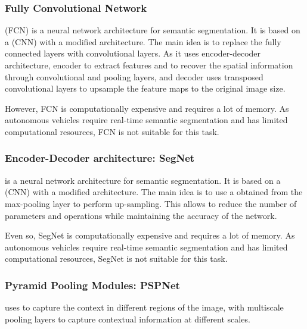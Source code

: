     \subsubsection{Fully Convolutional Network\cite{long2015fully}}

       (FCN) is a neural network architecture
      for semantic segmentation. It is based on a 
      (CNN) with a modified architecture. The main idea is to replace the fully
      connected layers with convolutional layers. As it uses encoder-decoder architecture,
      encoder to extract features and to recover the spatial information through
      convolutional and pooling layers, and decoder uses transposed convolutional
      layers to upsample the feature maps to the original image size\cite{long2015fully}.

      However, FCN is computationally expensive and requires a lot of memory. As
      autonomous vehicles require real-time semantic segmentation and has limited
      computational resources, FCN is not suitable for this task.

    \subsubsection{Encoder-Decoder architecture: SegNet\cite{badrinarayanan2017segnet}}

       is a neural network architecture for semantic segmentation. It
      is based on a  (CNN) with a modified architecture.
      The main idea is to use a  obtained from the max-pooling
      layer to perform up-sampling. This allows to reduce the number of parameters
      and operations while maintaining the accuracy of the network\cite{badrinarayanan2017segnet}.

      Even so, SegNet is computationally expensive and requires a lot of memory. As
      autonomous vehicles require real-time semantic segmentation and has limited
      computational resources, SegNet is not suitable for this task.

    \subsubsection{Pyramid Pooling Modules: PSPNet}

       uses  to capture the context in different
      regions of the image, with multiscale pooling layers to capture contextual
      information at different scales.
